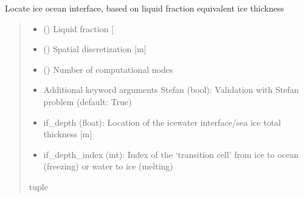 \documentclass[a4paper,11pt,english,openany]{sphinxmanual}
\begin{document}

\begin{fulllineitems}
\label{\detokenize{api/spyice.models.sea_ice_model:src.spyice.models.sea_ice_model.locate_ice_ocean_interface}}
\pysigstartsignatures
\pysiglinewithargsret
{}
{\sphinxparamcomma {}\sphinxparamcomma {}\sphinxparamcomma {}}
{}
\pysigstopsignatures
\sphinxAtStartPar
Locate ice ocean interface, based on liquid fraction equivalent ice thickness
\begin{quote}\begin{description}
\begin{itemize}
\item {} 
\sphinxAtStartPar
{} () \textendash{} Liquid fraction {[}\sphinxhyphen{}{]}

\item {} 
\sphinxAtStartPar
{} () \textendash{} Spatial discretization {[}m{]}

\item {} 
\sphinxAtStartPar
{} () \textendash{} Number of computational nodes

\item {} 
\sphinxAtStartPar
{} \textendash{} Additional keyword arguments
Stefan (bool): Validation with Stefan problem (default: True)

\end{itemize}

\sphinxAtStartPar
\begin{description}
\begin{itemize}
\item {} 
\sphinxAtStartPar
if\_depth (float): Location of the ice\sphinxhyphen{}water interface/sea ice total thickness {[}m{]}

\item {} 
\sphinxAtStartPar
if\_depth\_index (int): Index of the ‘transition cell’ from ice to ocean (freezing) or water to ice (melting)

\end{itemize}

\end{description}


\sphinxAtStartPar
tuple

\end{description}\end{quote}

\end{fulllineitems}
\end{document}
